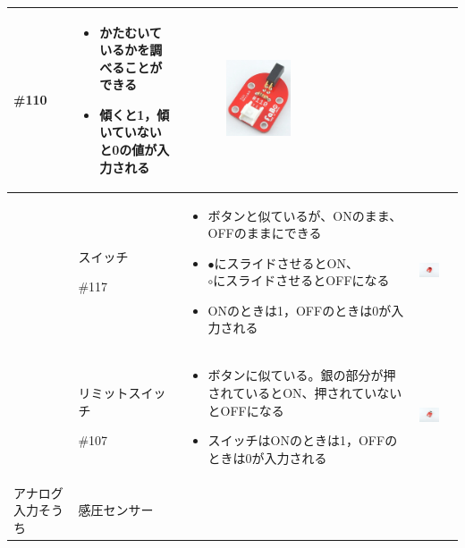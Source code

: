 \documentclass[a4paper,dvipdfmx]{jarticle}
\begin{document}
\begin{flushleft}
\begin{supertabular}{|m{2.34cm}|m{2.658cm}|m{6.4090004cm}|m{3.672cm}|m{1.211cm}|}
{\mdseries \#110} &
\begin{itemize}
\item
かたむいているかを調べることができる
\item
傾くと1，傾いていないと0の値が入力される
\end{itemize}
 &
{\mdseries 　　 \includegraphics[width=2.491cm,height=2.233cm]{text05-img/text05-img017.png} } &
{\mdseries \pageref{bkm:RefHeadingToc25517508239293}}\\\hline
 &
{\mdseries スイッチ}

{\mdseries \#117} &
\begin{itemize}
\item
ボタンと似ているが、ONのまま、OFFのままにできる
\item
${\bullet}にスライドさせると$ON、${\circ}にスライドさせると$OFFになる
\item ONのときは1，OFFのときは0が入力される
\end{itemize}
 &
\centering
\includegraphics[width=2.394cm,height=2.31cm]{text05-img/text05-img018.jpg}
 &
{\mdseries \pageref{bkm:RefHeadingToc25519508239293}}\\\hline
 &
{\mdseries リミットスイッチ}

{\mdseries \#107} &
\begin{itemize}
\item
ボタンに似ている。銀の部分が押されているとON、押されていないとOFFになる
\item
スイッチはONのときは1，OFFのときは0が入力される
\end{itemize}
 &
\centering
\includegraphics[width=2.426cm,height=2.8cm]{text05-img/text05-img019.jpg}
 &
{\mdseries \pageref{bkm:RefHeadingToc25709508239293}}\\\hline
{\mdseries アナログ入力そうち} &
{\mdseries 感圧センサー}


\end{supertabular}
\end{flushleft}
\end{document}
